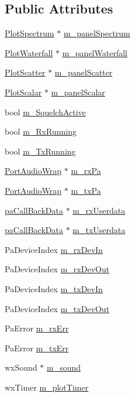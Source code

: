\subsection*{Public Attributes}
\begin{DoxyCompactItemize}
\item 
\hyperlink{class_plot_spectrum}{Plot\-Spectrum} $\ast$ \hyperlink{class_main_frame_a3fc0fe9ca321814476397cb32476e40c}{m\-\_\-panel\-Spectrum}
\item 
\hyperlink{class_plot_waterfall}{Plot\-Waterfall} $\ast$ \hyperlink{class_main_frame_a6f0fa80dd24e33f0d32228ac73418882}{m\-\_\-panel\-Waterfall}
\item 
\hyperlink{class_plot_scatter}{Plot\-Scatter} $\ast$ \hyperlink{class_main_frame_ada5dd6fc66036782c19f12175793da13}{m\-\_\-panel\-Scatter}
\item 
\hyperlink{class_plot_scalar}{Plot\-Scalar} $\ast$ \hyperlink{class_main_frame_a4b9bdbcea86dbffc51bc48ae586cbe01}{m\-\_\-panel\-Scalar}
\item 
bool \hyperlink{class_main_frame_a3087b1f1ea26a408da5f7b05f37afed4}{m\-\_\-\-Squelch\-Active}
\item 
bool \hyperlink{class_main_frame_a6b08d2c940a180091d73ca2520eb7572}{m\-\_\-\-Rx\-Running}
\item 
bool \hyperlink{class_main_frame_a8532b7b31adc84716e6edcf9c8d54192}{m\-\_\-\-Tx\-Running}
\item 
\hyperlink{class_port_audio_wrap}{Port\-Audio\-Wrap} $\ast$ \hyperlink{class_main_frame_abe7ab65d044b37b6973ed849bcd2759b}{m\-\_\-rx\-Pa}
\item 
\hyperlink{class_port_audio_wrap}{Port\-Audio\-Wrap} $\ast$ \hyperlink{class_main_frame_a2bedcb7f813060b8fb918ec315496f17}{m\-\_\-tx\-Pa}
\item 
\hyperlink{structpa_call_back_data}{pa\-Call\-Back\-Data} $\ast$ \hyperlink{class_main_frame_aed30473c47c84fdc1fe39f2d21caf788}{m\-\_\-rx\-Userdata}
\item 
\hyperlink{structpa_call_back_data}{pa\-Call\-Back\-Data} $\ast$ \hyperlink{class_main_frame_a4e5eca6ff8ed0fd8cf67cdfeb04ce28e}{m\-\_\-tx\-Userdata}
\item 
Pa\-Device\-Index \hyperlink{class_main_frame_ab9d54920598f48bdbfa67161b3167b11}{m\-\_\-rx\-Dev\-In}
\item 
Pa\-Device\-Index \hyperlink{class_main_frame_aa73d0adbbf4fe9f2d14778ad1474a3d3}{m\-\_\-rx\-Dev\-Out}
\item 
Pa\-Device\-Index \hyperlink{class_main_frame_a5d89367413fe47a5d82b6aa7c7827746}{m\-\_\-tx\-Dev\-In}
\item 
Pa\-Device\-Index \hyperlink{class_main_frame_aac31ac35a3c5bb4847e94501f18f3eab}{m\-\_\-tx\-Dev\-Out}
\item 
Pa\-Error \hyperlink{class_main_frame_a9410cdbd4251567ae01c77d8e7bd505b}{m\-\_\-rx\-Err}
\item 
Pa\-Error \hyperlink{class_main_frame_a9af2231b1aac90f8c6abdede80eb0911}{m\-\_\-tx\-Err}
\item 
wx\-Sound $\ast$ \hyperlink{class_main_frame_a6458de14647c34b3ae5ace81992710d6}{m\-\_\-sound}
\item 
wx\-Timer \hyperlink{class_main_frame_aabe58bef730ca69b342f8ac663c3d70d}{m\-\_\-plot\-Timer}
\end{DoxyCompactItemize}
